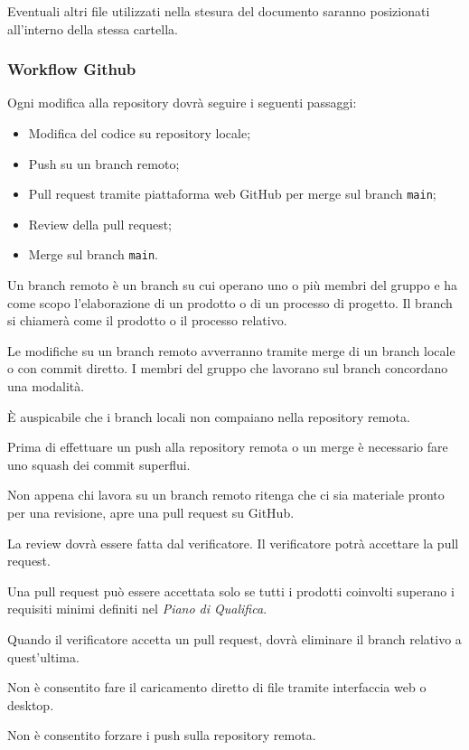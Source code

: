 \documentclass[a4paper, 12pt]{article}
\begin{document}
Eventuali altri file utilizzati nella stesura del documento saranno posizionati all'interno della stessa cartella.

\subsubsection{Workflow Github}

Ogni modifica alla repository dovrà seguire i seguenti passaggi:
\begin{itemize}
\item Modifica del codice su repository locale;
\item Push su un branch remoto;
\item Pull request tramite piattaforma web GitHub per merge sul branch \texttt{main};
\item Review della pull request;
\item Merge sul branch \texttt{main}.
\end{itemize}

Un branch remoto è un branch su cui operano uno o più membri del gruppo e ha come scopo l'elaborazione di un prodotto o di un processo di progetto. Il branch si chiamerà come il prodotto o il processo relativo.

Le modifiche su un branch remoto avverranno tramite merge di un branch locale o con commit diretto. I membri del gruppo che lavorano sul branch concordano una modalità.

È auspicabile che i branch locali non compaiano nella repository remota.

Prima di effettuare un push alla repository remota o un merge è necessario fare uno squash dei commit superflui.

Non appena chi lavora su un branch remoto ritenga che ci sia materiale pronto per una revisione, apre una pull request su GitHub.

La review dovrà essere fatta dal verificatore. Il verificatore potrà accettare la pull request.

Una pull request può essere accettata solo se tutti i prodotti coinvolti superano i requisiti minimi definiti nel \textit{Piano di Qualifica}.

Quando il verificatore accetta un pull request, dovrà eliminare il branch relativo a quest'ultima.

Non è consentito fare il caricamento diretto di file tramite interfaccia web o desktop.

Non è consentito forzare i push sulla repository remota.
\end{document}
